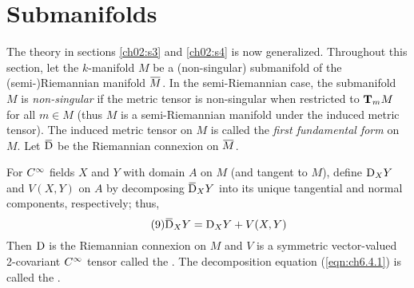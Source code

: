\documentclass[../main]{subfiles}
\begin{document}
\section{Submanifolds}\label{ch06:s4}

The theory in sections \ref{ch02:s3} and \ref{ch02:s4} is now generalized. Throughout this section, let the $k$-manifold $M$ be a (non-singular) submanifold of the (semi-)Riemannian manifold $\xoverline M$. In the semi-Riemannian case, the submanifold $M$ is \emph{non-singular} if the metric tensor is non-singular when restricted to $\tangentspace{M}{m}$ for all $m\in M$ (thus $M$ is a semi-Riemannian manifold under the induced metric tensor). The induced metric tensor on $M$ is called the \emph{first fundamental form} on $M$. Let $\covariant$ be the Riemannian connexion on $\xoverline M$.



\begin{theorem} \label{thm:ch6.4.1}
For $\CInfty$ fields $X$ and $Y$ with domain $A$ on $M$ (and tangent to $M$), define $\D_XY$ and $V(X,Y)$ on $A$ by decomposing $\covariant_XY$ into its unique tangential and normal components, respectively; thus,
\begin{equation}\tag{9} \label{eqn:ch6.4.1}
    \covariant_XY=\D_XY+V(X,Y)
\end{equation}
Then $\D$ is the Riemannian connexion on $M$ and $V$ is a symmetric vector-valued 2-covariant $\CInfty$ tensor called the . The decomposition equation (\ref{eqn:ch6.4.1}) is called the .
\end{theorem}
\end{document}
